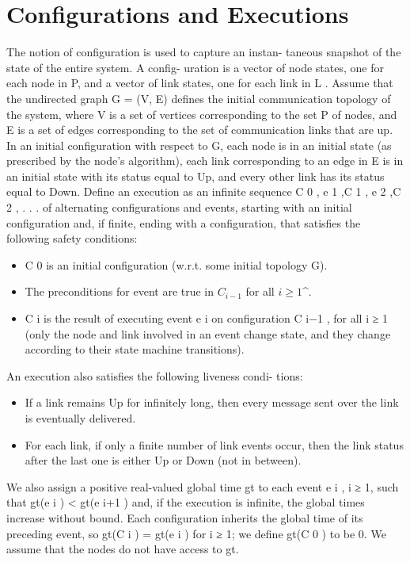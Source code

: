 \section{Configurations and Executions}
The notion of configuration is used to capture an instan-
taneous snapshot of the state of the entire system. A config-
uration is a vector of node states, one for each node in P,
and a vector of link states, one for each link in L .
Assume that the undirected graph G = (V, E) defines the
initial communication topology of the system, where V is a
set of vertices corresponding to the set P of nodes, and E
is a set of edges corresponding to the set of communication
links that are up. In an initial configuration with respect
to G, each node is in an initial state (as prescribed by the
node’s algorithm), each link corresponding to an edge in E
is in an initial state with its status equal to Up, and every
other link has its status equal to Down.
Define an execution as an infinite sequence
C 0 , e 1 ,C 1 , e 2 ,C 2 , . . . of alternating configurations and
events, starting with an initial configuration and, if finite,
ending with a configuration, that satisfies the following
safety conditions:
\begin{itemize}
\item C 0 is an initial configuration (w.r.t. some initial topology G).
\item The preconditions for event are true in $C_{i-1}$ for all $i\geq 1$^.
\item C i is the result of executing event e i on configuration C i−1 , for all i ≥ 1 (only the node and link involved in an event change state, and they change according to their state machine transitions).
\end{itemize}

An execution also satisfies the following liveness condi-
tions:
\begin{itemize}
\item If a link remains Up for infinitely long, then every message sent over the link is eventually delivered.
\item For each link, if only a finite number of link events occur, then the link status after the last one is either Up or Down (not in between).
\end{itemize}

We also assign a positive real-valued global time gt to each event e i , i ≥ 1, such that gt(e i ) < gt(e i+1 ) and, if the execution is infinite, the global times increase without bound. Each configuration inherits the global time of its preceding event, so gt(C i ) = gt(e i ) for i ≥ 1; we define gt(C 0 ) to be 0. We assume that the nodes do not have access to gt.


